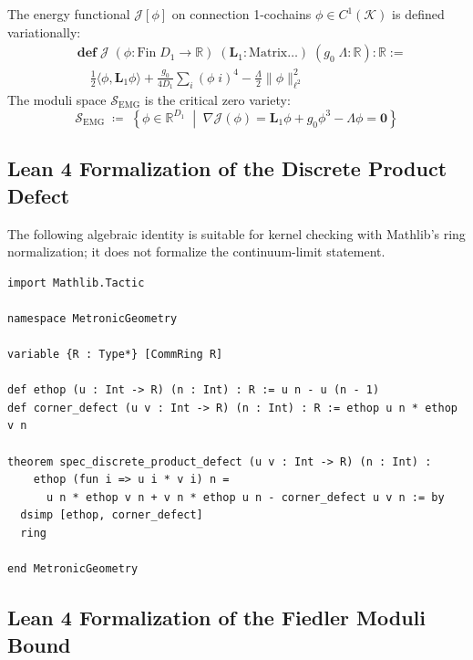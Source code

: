 \documentclass[
    12pt,
    a4paper,
    headings=normal,
    twoside=false,
    open=any,
    parskip=half
]{scrbook}
\begin{document}
\begin{physdefinition}
The energy functional $\mathcal{J}[\phi]$ on connection 1-cochains $\phi \in C^1(\mathcal{K})$ is defined variationally:
\begin{align*}
&\mathbf{def}\;\mathcal{J}\;(\phi \colon \mathrm{Fin}\;D_1 \to \mathbb{R})\;(\mathbf{L}_1 \colon \mathrm{Matrix}\dots)\;(g_0\;\Lambda \colon \mathbb{R}) \colon \mathbb{R} := \\
&\quad \frac{1}{2} \langle \phi, \mathbf{L}_1 \phi \rangle + \frac{g_0}{4 D_1} \sum_{i} (\phi\;i)^4 - \frac{\Lambda}{2} \|\phi\|_{\ell^2}^2
\end{align*}
The moduli space $\mathscr{S}_{\text{EMG}}$ is the critical zero variety:
\begin{equation*}
\mathscr{S}_{\text{EMG}} \;\coloneqq\; \left\{ \phi \in \mathbb{R}^{D_1} \;\middle|\; \nabla \mathcal{J}(\phi) = \mathbf{L}_1 \phi + g_0 \phi^3 - \Lambda \phi = \mathbf{0} \right\}
\end{equation*}
\end{physdefinition}
\subsection{Lean 4 Formalization of the Discrete Product Defect}

The following algebraic identity is suitable for kernel checking with Mathlib's ring normalization; it does not formalize the continuum-limit statement.
\begin{lstlisting}[caption={Lean 4 proof of the discrete product-defect identity.}]
import Mathlib.Tactic

namespace MetronicGeometry

variable {R : Type*} [CommRing R]

def ethop (u : Int -> R) (n : Int) : R := u n - u (n - 1)
def corner_defect (u v : Int -> R) (n : Int) : R := ethop u n * ethop v n

theorem spec_discrete_product_defect (u v : Int -> R) (n : Int) :
    ethop (fun i => u i * v i) n =
      u n * ethop v n + v n * ethop u n - corner_defect u v n := by
  dsimp [ethop, corner_defect]
  ring

end MetronicGeometry
\end{lstlisting}

\subsection{Lean 4 Formalization of the Fiedler Moduli Bound}
\end{document}
